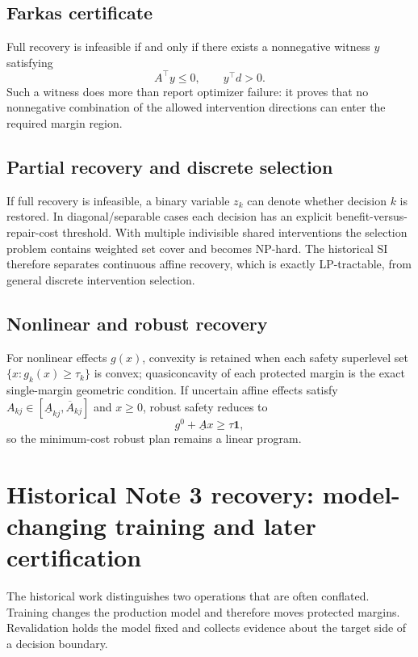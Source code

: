 \documentclass[11pt,letterpaper]{article}
\theoremstyle{plain}
\newcommand{\1}{\mathbf 1}
\begin{document}
\subsection{Farkas certificate}
Full recovery is infeasible if and only if there exists a nonnegative witness $y$ satisfying
\begin{equation}
 A^\top y\le0,\qquad y^\top d>0.
\end{equation}
Such a witness does more than report optimizer failure: it proves that no nonnegative combination of the allowed intervention directions can enter the required margin region.

\subsection{Partial recovery and discrete selection}
If full recovery is infeasible, a binary variable $z_k$ can denote whether decision $k$ is restored. In diagonal/separable cases each decision has an explicit benefit-versus-repair-cost threshold. With multiple indivisible shared interventions the selection problem contains weighted set cover and becomes NP-hard. The historical SI therefore separates continuous affine recovery, which is exactly LP-tractable, from general discrete intervention selection.

\subsection{Nonlinear and robust recovery}
For nonlinear effects $g(x)$, convexity is retained when each safety superlevel set $\{x:g_k(x)\ge\tau_k\}$ is convex; quasiconcavity of each protected margin is the exact single-margin geometric condition. If uncertain affine effects satisfy $A_{kj}\in[\underline A_{kj},\overline A_{kj}]$ and $x\ge0$, robust safety reduces to
\begin{equation}
 g^0+\underline A x\ge\tau\1,
\end{equation}
so the minimum-cost robust plan remains a linear program.

\clearpage
\section{Historical Note 3 recovery: model-changing training and later certification}
The historical work distinguishes two operations that are often conflated. Training changes the production model and therefore moves protected margins. Revalidation holds the model fixed and collects evidence about the target side of a decision boundary.
\end{document}
